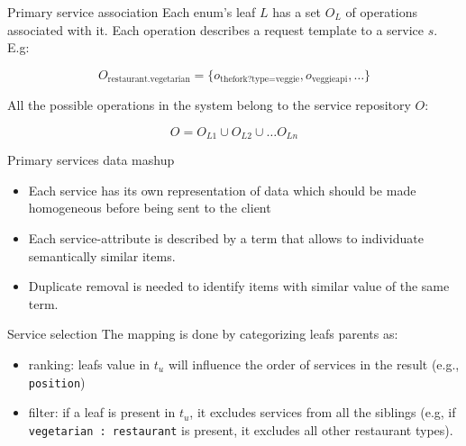 \documentclass[smaller]{beamer}
\begin{document}
\begin{frame}[label={sec:orgheadline11}]{Primary service association}
Each enum's leaf \(L\) has a set \(O_L\) of operations associated with it. Each 
operation describes a request template to a service \(s\). E.g:

\begin{equation}
O_{\textrm{restaurant.vegetarian}}= \{ o_{\textrm{thefork?type=veggie}}, o_{\textrm{veggieapi}}, \ldots \}
\end{equation}

All the possible operations in the system belong to the service repository \(O\):

\begin{equation}
O = O_{L1} \cup O_{L2} \cup \ldots O_{Ln}
\end{equation}
\end{frame}

\begin{frame}[label={sec:orgheadline12}]{Primary services data mashup}
\begin{itemize}
\item Each service has its own representation of data which should be made
homogeneous before being sent to the client

\item Each service-attribute is described by a \alert{term} that allows to individuate
semantically similar items.

\item Duplicate removal is needed to identify items with similar value of the same term.
\end{itemize}
\end{frame}

\begin{frame}[fragile,label={sec:orgheadline13}]{Service selection}
 The mapping is done by categorizing leafs parents as:

\begin{itemize}
\item \alert{ranking}: leafs value in \(t_u\) will influence the order of services in the result (e.g., \texttt{position})

\item \alert{filter}: if a leaf is present in \(t_u\), it excludes services from all the siblings (e.g, if
\texttt{vegetarian : restaurant} is present, it excludes all other restaurant types).
\end{itemize}
\end{frame}
\end{document}
